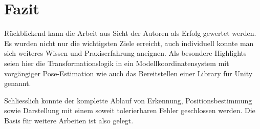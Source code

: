 \chapter{Fazit}
Rückblickend kann die Arbeit aus Sicht der Autoren als Erfolg gewertet werden. Es wurden nicht nur die wichtigsten Ziele
erreicht, auch individuell konnte man sich weiteres Wissen und Praxiserfahrung aneignen. Als besondere Highlights seien
hier die Transformationslogik in ein Modellkoordinatensystem mit vorgängiger Pose-Estimation wie auch das Bereitstellen
einer Library für Unity genannt.

Schliesslich konnte der komplette Ablauf von Erkennung, Positionsbestimmung sowie Darstellung mit einem soweit tolerierbaren
Fehler geschlossen werden. Die Basis für weitere Arbeiten ist also gelegt.